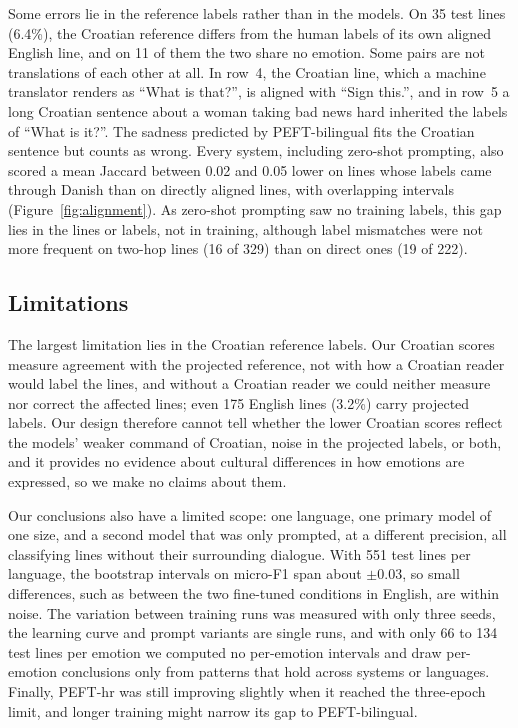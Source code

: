 Some errors lie in the reference labels rather than in the models. On 35 test lines (6.4\%), the Croatian reference differs from the human labels of its own aligned English line, and on 11 of them the two share no emotion. Some pairs are not translations of each other at all. In row~4, the Croatian line, which a machine translator renders as ``What is that?'', is aligned with ``Sign this.'', and in row~5 a long Croatian sentence about a woman taking bad news hard inherited the labels of ``What is it?''. The sadness predicted by PEFT-bilingual fits the Croatian sentence but counts as wrong. Every system, including zero-shot prompting, also scored a mean Jaccard between 0.02 and 0.05 lower on lines whose labels came through Danish than on directly aligned lines, with overlapping intervals (Figure~\ref{fig:alignment}). As zero-shot prompting saw no training labels, this gap lies in the lines or labels, not in training, although label mismatches were not more frequent on two-hop lines (16 of 329) than on direct ones (19 of 222).

\subsection{Limitations}
\label{sec:limitations}

The largest limitation lies in the Croatian reference labels. Our Croatian scores measure agreement with the projected reference, not with how a Croatian reader would label the lines, and without a Croatian reader we could neither measure nor correct the affected lines; even 175 English lines (3.2\%) carry projected labels. Our design therefore cannot tell whether the lower Croatian scores reflect the models' weaker command of Croatian, noise in the projected labels, or both, and it provides no evidence about cultural differences in how emotions are expressed, so we make no claims about them.

Our conclusions also have a limited scope: one language, one primary model of one size, and a second model that was only prompted, at a different precision, all classifying lines without their surrounding dialogue. With 551 test lines per language, the bootstrap intervals on micro-F1 span about $\pm 0.03$, so small differences, such as between the two fine-tuned conditions in English, are within noise. The variation between training runs was measured with only three seeds, the learning curve and prompt variants are single runs, and with only 66 to 134 test lines per emotion we computed no per-emotion intervals and draw per-emotion conclusions only from patterns that hold across systems or languages. Finally, PEFT-hr was still improving slightly when it reached the three-epoch limit, and longer training might narrow its gap to PEFT-bilingual.
